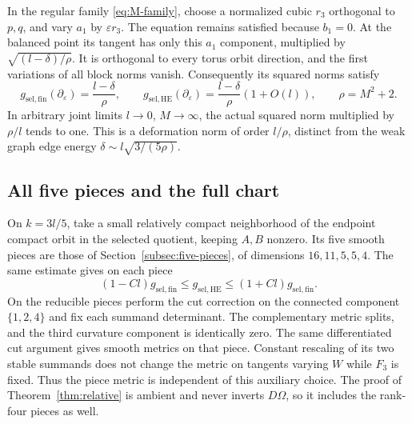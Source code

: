 \documentclass[11pt]{amsart}
\theoremstyle{definition}
\theoremstyle{remark}
\begin{document}
In the regular family \eqref{eq:M-family}, choose a normalized cubic
$r_3$ orthogonal to $p,q$, and vary $a_1$ by $\varepsilon r_3$.
The equation remains satisfied because $b_1=0$. At the balanced point
its tangent has only this $a_1$ component, multiplied by
$\sqrt{(l-\delta)/\rho}$. It is orthogonal to every torus orbit
direction, and the first variations of all block norms vanish.
Consequently its squared norms satisfy
\begin{equation}\label{eq:weak-tangent}
 g_{\mathrm{sel},\mathrm{fin}}(\partial_\varepsilon)
       =\frac{l-\delta}{\rho},\qquad
 g_{\mathrm{sel},\mathrm{HE}}(\partial_\varepsilon)
       =\frac{l-\delta}{\rho}(1+O(l)),\qquad \rho=M^2+2.
\end{equation}
In arbitrary joint limits $l\to0$, $M\to\infty$, the actual squared
norm multiplied by $\rho/l$ tends to one. This is a deformation norm
of order $l/\rho$, distinct from the weak graph edge energy
$\delta\sim l\sqrt{3/(5\rho)}$.

\subsection{All five pieces and the full chart}
On $k=3l/5$, take a small relatively compact neighborhood of the
endpoint compact orbit in the selected quotient, keeping $A,B$
nonzero. Its five smooth pieces are those of
Section~\ref{subsec:five-pieces}, of dimensions $16,11,5,5,4$.
The same estimate gives on each piece
\begin{equation}\label{eq:five-piece-metric}
 (1-Cl)g_{\mathrm{sel},\mathrm{fin}}
 \le g_{\mathrm{sel},\mathrm{HE}}
 \le(1+Cl)g_{\mathrm{sel},\mathrm{fin}}.
\end{equation}
On the reducible pieces perform the cut correction on the connected
component $\{1,2,4\}$ and fix each summand determinant. The complementary
metric splits, and the third curvature component is identically zero.
The same differentiated cut argument gives smooth metrics on that piece.
Constant rescaling of its two stable summands does not change the metric
on tangents varying $W$ while $F_3$ is fixed. Thus the piece metric is
independent of this auxiliary choice. The proof of
Theorem~\ref{thm:relative} is ambient and never inverts $D\Omega$,
so it includes the rank-four pieces as well.
\end{document}
